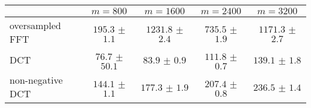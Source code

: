 \centering
\renewcommand{\arraystretch}{1.2}
\begin{tabular}{@{}lcccc@{}}
\toprule
 & $m=800$ & $m=1600$ & $m=2400$ & $m=3200$\\
\midrule
oversampled FFT & $195.3$ $\pm$ $1.1$ & $1231.8$ $\pm$ $2.4$ & $735.5$ $\pm$ $1.9$ & $1171.3$ $\pm$ $2.7$ \\
DCT & $76.7$ $\pm$ $50.1$ & $83.9$ $\pm$ $0.9$ & $111.8$ $\pm$ $0.7$ & $139.1$ $\pm$ $1.8$ \\
non-negative DCT & $144.1$ $\pm$ $1.1$ & $177.3$ $\pm$ $1.9$ & $207.4$ $\pm$ $0.8$ & $236.5$ $\pm$ $1.4$ \\
\bottomrule
\end{tabular}
